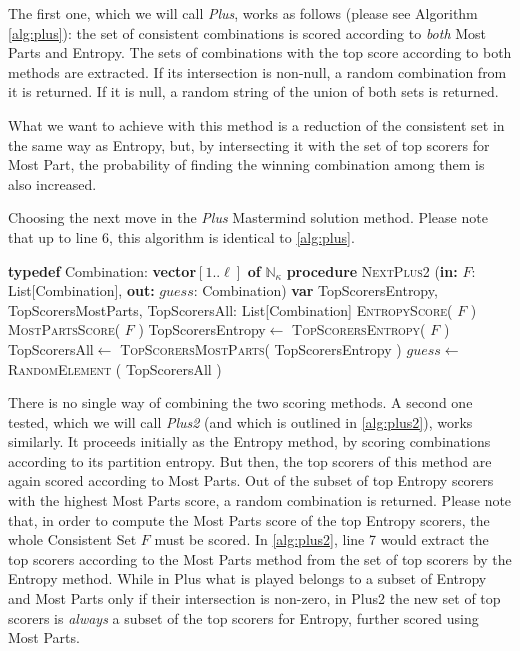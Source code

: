 \documentclass[preprint,12pt]{elsarticle}
\begin{document}
The first one, which we will call  {\em Plus}, works as follows (please see Algorithm \ref{alg:plus}): the set of
consistent combinations is scored according to {\em both} Most Parts
and Entropy. The sets of combinations with the top score according to
both methods are extracted. If its intersection is non-null, a random
combination from it is returned. If it is null, a random
string of the union of both sets is returned. 

What we want to achieve with this method is a reduction of the consistent set in the same way as Entropy, but, by
intersecting it with the set of top scorers for Most Part, the
probability of finding the winning combination among them is also
increased. 
%
\begin{algorithm*}[htb!]
\caption{Choosing the next move in the {\em Plus} Mastermind solution
  method. Please note that up to line 6, this algorithm is identical to \ref{alg:plus}.}\label{alg:plus2}
\smallskip
\textbf{typedef} Combination: \textbf{vector}$[1..\ell]$ \textbf{of} $\mathbb{N}_\kappa$\;
\BlankLine
\textbf{procedure} \textsc{NextPlus2} (\textbf{in:} $F$: List[Combination], \textbf{out:} $guess$: Combination)\;
\textbf{var} TopScorersEntropy, 
 TopScorersMostParts, 
 TopScorersAll: List[Combination]\; 
\textsc{EntropyScore}( $F$ )\;
\textsc{MostPartsScore}( $F$ )\;
TopScorersEntropy$\leftarrow$ \textsc{TopScorersEntropy}( $F$ )\;
TopScorersAll$\leftarrow$ \textsc{TopScorersMostParts}( TopScorersEntropy )\;
$guess\leftarrow$ \textsc{RandomElement} ( TopScorersAll )\;
\end{algorithm*}

There is no single way of combining the two scoring methods. A second
one tested, which we will call {\em Plus2} (and which is outlined in \ref{alg:plus2}), works similarly. It proceeds
initially as the Entropy method, by scoring combinations according to
its partition entropy. But then, the top scorers of this method are
again scored according to Most Parts. Out of the subset of top Entropy
scorers with the highest Most Parts score, a random combination is
returned. Please note that, in order to compute the Most Parts score
of the top Entropy scorers, the whole Consistent Set $F$ must be
scored. In \ref{alg:plus2}, line 7 would extract the top scorers
according to the Most Parts method from the set of top scorers by the
Entropy method. While in Plus what is played belongs
to a subset of Entropy and Most Parts only if their intersection is
non-zero, in Plus2 the new set of top scorers is {\em always} a subset
of the top scorers for Entropy, further scored using  Most Parts. 
\end{document}
